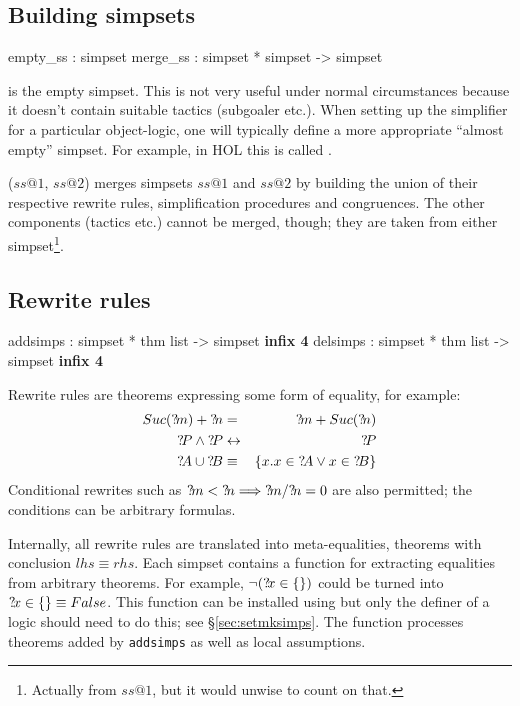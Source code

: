 \subsection{Building simpsets}
\begin{ttbox}
empty_ss : simpset
merge_ss : simpset * simpset -> simpset
\end{ttbox}
\begin{ttdescription}
  
\item[\ttindexbold{empty_ss}] is the empty simpset.  This is not very useful
  under normal circumstances because it doesn't contain suitable tactics
  (subgoaler etc.).  When setting up the simplifier for a particular
  object-logic, one will typically define a more appropriate ``almost empty''
  simpset.  For example, in HOL this is called .
  
\item[\ttindexbold{merge_ss} ($ss@1$, $ss@2$)] merges simpsets $ss@1$
  and $ss@2$ by building the union of their respective rewrite rules,
  simplification procedures and congruences.  The other components
  (tactics etc.) cannot be merged, though; they are taken from either
  simpset\footnote{Actually from $ss@1$, but it would unwise to count
    on that.}.

\end{ttdescription}


\subsection{Rewrite rules}
\begin{ttbox}
addsimps : simpset * thm list -> simpset \hfill{\bf infix 4}
delsimps : simpset * thm list -> simpset \hfill{\bf infix 4}
\end{ttbox}

 Rewrite rules are theorems expressing some
form of equality, for example:
\begin{eqnarray*}
  Suc(\Var{m}) + \Var{n} &=&      \Var{m} + Suc(\Var{n}) \\
  \Var{P}\conj\Var{P}    &\bimp&  \Var{P} \\
  \Var{A} \un \Var{B} &\equiv& \{x.x\in \Var{A} \disj x\in \Var{B}\}
\end{eqnarray*}
Conditional rewrites such as ${?\!m}<{?\!n} \Longrightarrow {?\!m}/{?\!n} =
0$ are also permitted; the conditions can be arbitrary formulas.

Internally, all rewrite rules are translated into meta-equalities,
theorems with conclusion $lhs \equiv rhs$.  Each simpset contains a
function for extracting equalities from arbitrary theorems.  For
example, $\neg({?\!x}\in \{\})$ could be turned into ${?\!x}\in \{\}
\equiv False$.  This function can be installed using
 but only the definer of a logic should need to do
this; see {\S}\ref{sec:setmksimps}.  The function processes theorems
added by \texttt{addsimps} as well as local assumptions.

